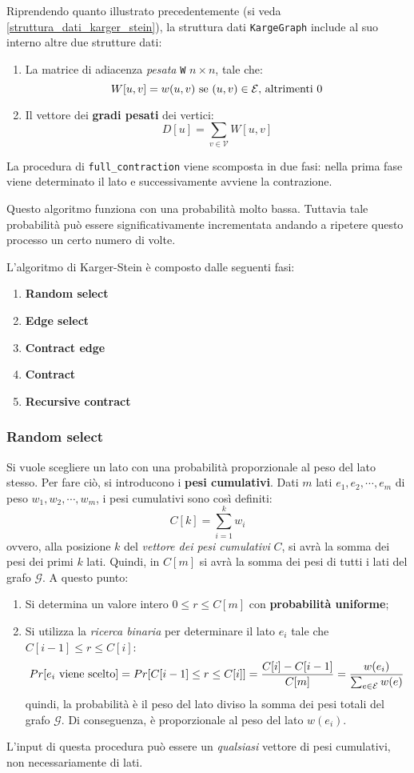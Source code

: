 Riprendendo quanto illustrato precedentemente (si veda 
\ref{struttura_dati_karger_stein}), la struttura dati \verb|KargeGraph| 
include al suo interno altre due strutture dati:
\begin{enumerate}
    \item La matrice di adiacenza \textit{pesata} \verb|W|
    $n \times n$, tale che: 
    \[
        W[u,v] = w(u,v) \textnormal{ se } (u,v) \in \mathcal{E} 
        \textnormal{, altrimenti } 0
    \]
    \item Il vettore dei \textbf{gradi pesati} dei vertici:
    \[
        D[u] = \sum_{v \in \mathcal{V}} W[u,v]
    \]
\end{enumerate}

La procedura di \verb|full_contraction| viene scomposta in due fasi: 
nella prima fase viene determinato il lato e successivamente avviene la 
contrazione.

Questo algoritmo funziona con una probabilità molto bassa. Tuttavia tale probabilità 
può essere significativamente incrementata andando a ripetere questo processo un certo 
numero di volte.

L'algoritmo di Karger-Stein è composto dalle seguenti fasi:
\begin{enumerate}
    \item \textbf{Random select}
    \item \textbf{Edge select}
    \item \textbf{Contract edge}
    \item \textbf{Contract}
    \item \textbf{Recursive contract}
\end{enumerate}

\subsubsection*{Random select}
Si vuole scegliere un lato con una probabilità 
proporzionale al peso del lato stesso. Per fare ciò, si introducono i 
\textbf{pesi cumulativi}. Dati $m$ lati $e_1, e_2, \cdots , e_m$ di peso 
$w_1, w_2, \cdots , w_m$, i pesi cumulativi sono così definiti:
\[
    C[k] = \sum_{i = 1}^{k} w_i
\]
ovvero, alla posizione $k$ del \textit{vettore dei pesi cumulativi} $C$, si avrà 
la somma dei pesi dei primi $k$ lati. Quindi, in $C[m]$ si avrà la somma dei pesi 
di tutti i lati del grafo $\mathcal{G}$. A questo punto:
\begin{enumerate}
    \item Si determina un valore intero $0 \le r \le C[m]$ con 
    \textbf{probabilità uniforme};
    \item \label{scelta_lato} Si utilizza la \textit{ricerca binaria} per 
    determinare il lato $e_i$ tale che $C[i - 1] \le r \le C[i]$:
    \[
        Pr[e_i \textnormal{ viene scelto}] = Pr[C[i - 1] \le r \le C[i]] = \frac{C[i] - C[i - 1]}{C[m]} = \frac{w(e_i)}{\sum_{e \in \mathcal{E}} w(e)}
    \]
    quindi, la probabilità è il peso del lato diviso la somma dei pesi totali del 
    grafo $\mathcal{G}$. Di conseguenza, è proporzionale al peso del lato $w(e_i)$.
\end{enumerate}
L'input di questa procedura può essere un \textit{qualsiasi} vettore di pesi 
cumulativi, non necessariamente di lati.

